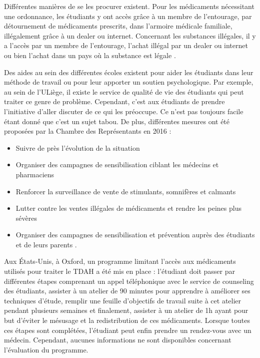 Différentes manières de se les procurer existent. Pour les médicaments
nécessitant une ordonnance, les étudiants y ont accès grâce à un membre de l'entourage, par détournement de médicaments prescrits, dans l'armoire médicale familiale, illégalement grâce à un dealer ou internet.
Concernant les substances illégales, il y a l'accès par un membre de
l'entourage, l'achat illégal par un dealer ou internet ou bien l'achat dans un pays où la substance est légale \parencite{canterbury_smart_1994} \parencite{c_guillain_les_2021, sharif_assessing_2022}.
\newline

Des aides au sein des différentes écoles existent pour aider les
étudiants dans leur méthode de travail ou pour leur apporter un soutien
psychologique. Par exemple, au sein de l'ULiège, il existe le service de
qualité de vie des étudiants qui peut traiter ce genre de problème.
Cependant, c'est aux étudiants de prendre l'initiative d'aller
discuter de ce qui les préoccupe. Ce n'est pas toujours facile étant donné que c'est un sujet tabou. De plus, différentes mesures ont été proposées par la Chambre des Représentants en 2016 : 
\begin{itemize}

\item
Suivre de près l'évolution de la situation
\item
Organiser des campagnes de sensibilisation ciblant les médecins et pharmaciens
\item
Renforcer la surveillance de vente de stimulants, somnifères et calmants
\item
Lutter contre les ventes illégales de médicaments et rendre les peines plus sévères
\item
Organiser des campagnes  de sensibilisation et prévention auprès des étudiants et de leurs parents \parencite{noauthor_proposition_2016}.

\end{itemize} 

Aux États-Unis, à Oxford, un programme limitant l'accès aux médicaments utilisés pour traiter le TDAH a été mis en place : l'étudiant doit passer par différentes étapes comprenant un appel téléphonique avec le service de counseling des étudiants, assister à un atelier de 90 minutes pour apprendre à améliorer ses techniques d'étude, remplir une feuille d'objectifs de travail suite à cet atelier pendant plusieurs semaines et finalement, assister à un atelier de 1h ayant pour but d'éviter le mésusage et la redistribution de ces médicaments. Lorsque toutes ces étapes sont complétées, l'étudiant peut enfin prendre un rendez-vous avec un médecin. Cependant, aucunes informations ne sont disponibles concernant l'évaluation du programme. 

